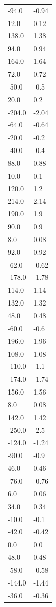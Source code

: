 \begin{longtable}{ll}
-94.0 & -0.94 \\
12.0 & 0.12 \\
138.0 & 1.38 \\
94.0 & 0.94 \\
164.0 & 1.64 \\
72.0 & 0.72 \\
-50.0 & -0.5 \\
20.0 & 0.2 \\
-204.0 & -2.04 \\
-64.0 & -0.64 \\
-20.0 & -0.2 \\
-40.0 & -0.4 \\
88.0 & 0.88 \\
10.0 & 0.1 \\
120.0 & 1.2 \\
214.0 & 2.14 \\
190.0 & 1.9 \\
90.0 & 0.9 \\
8.0 & 0.08 \\
92.0 & 0.92 \\
-62.0 & -0.62 \\
-178.0 & -1.78 \\
114.0 & 1.14 \\
132.0 & 1.32 \\
48.0 & 0.48 \\
-60.0 & -0.6 \\
196.0 & 1.96 \\
108.0 & 1.08 \\
-110.0 & -1.1 \\
-174.0 & -1.74 \\
156.0 & 1.56 \\
8.0 & 0.08 \\
142.0 & 1.42 \\
-250.0 & -2.5 \\
-124.0 & -1.24 \\
-90.0 & -0.9 \\
46.0 & 0.46 \\
-76.0 & -0.76 \\
6.0 & 0.06 \\
34.0 & 0.34 \\
-10.0 & -0.1 \\
-42.0 & -0.42 \\
0.0 & 0.0 \\
48.0 & 0.48 \\
-58.0 & -0.58 \\
-144.0 & -1.44 \\
-36.0 & -0.36 \\

\end{longtable}
